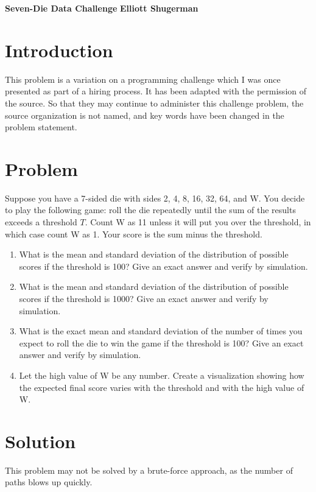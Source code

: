 \documentclass[a4paper, 11pt]{article}
\begin{document}
\large\textbf{Seven-Die Data Challenge } \hfill \textbf{Elliott Shugerman} \\


\section{Introduction}This problem is a variation on a programming challenge which I was once presented as part of a hiring process. It has been adapted with the permission of the source. So that they may continue to administer this challenge problem, the source organization is not named, and key words have been changed in the problem statement.
 
\section{Problem}
Suppose you have a 7-sided die with sides 2, 4, 8, 16, 32, 64, and W. You decide to play the following game: roll the die repeatedly until the sum of the results exceeds a threshold $T$. Count W as 11 unless it will put you over the threshold, in which case count W as 1. Your score is the sum minus the threshold.


\begin{enumerate}[\hspace{5mm}I.]
	\item What is the mean and standard deviation of the distribution of possible scores if the threshold is 100? Give an exact answer and verify by simulation.
	\item What is the mean and standard deviation of the distribution of possible scores if the threshold is 1000? Give an exact answer and verify by simulation.
	\item What is the exact mean and standard deviation of the number of times you expect to roll the die to win the game if the threshold is 100? Give an exact answer and verify by simulation.
	\item Let the high value of W be any number. Create a visualization showing how the expected final score varies with the threshold and with the high value of W.

\end{enumerate}
 
\section{Solution}
This problem may not be solved by a brute-force approach, as the number of paths blows up quickly.
\end{document}
